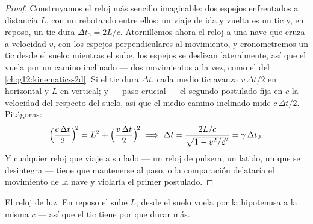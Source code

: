 \begin{proof}
Construyamos el reloj más sencillo imaginable: dos espejos enfrentados a distancia
$L$, con un  rebotando entre ellos; un viaje de ida y vuelta es un tic y, en
reposo, un tic dura $\Delta t_0 = 2L/c$. Atornillemos ahora el reloj a una nave que
cruza a velocidad $v$, con los espejos perpendiculares al movimiento, y cronometremos
un tic desde el suelo: mientras el  sube, los espejos se deslizan lateralmente,
así que el  vuela por un camino inclinado --- dos movimientos a la vez, como el
 del \cref{ch:g12:kinematics-2d}. Si el tic dura $\Delta t$, cada medio tic
avanza $v\,\Delta t/2$ en horizontal y $L$ en vertical; y --- paso crucial --- el
segundo postulado fija en $c$ la velocidad del  respecto del suelo, así que el
medio camino inclinado mide $c\,\Delta t/2$. Pitágoras:
\[
\Bigl(\frac{c\,\Delta t}{2}\Bigr)^{\!2} = L^2 + \Bigl(\frac{v\,\Delta t}{2}\Bigr)^{\!2}
\;\Longrightarrow\;
\Delta t = \frac{2L/c}{\sqrt{1 - v^2/c^2}} = \gamma\,\Delta t_0 .
\]
Y cualquier reloj que viaje a su lado --- un reloj de pulsera, un latido, un 
que se desintegra --- tiene que mantenerse al paso, o la comparación delataría el
movimiento de la nave y violaría el primer postulado.
\end{proof}

\begin{omfigure}
\qquad
{}

{\small El reloj de luz. En reposo el  sube $L$; desde el suelo vuela por la
hipotenusa a la misma $c$ --- así que el tic tiene por  que durar más.}
\end{omfigure}

